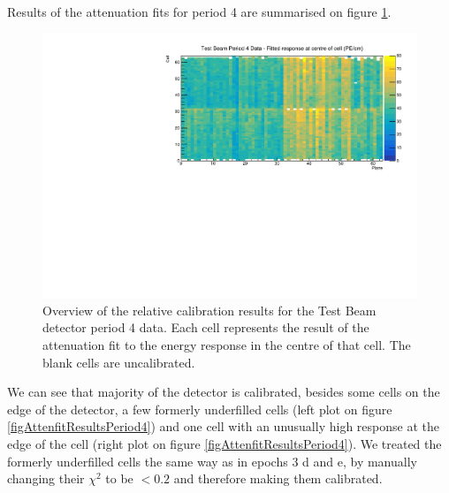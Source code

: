 \documentclass[12pt,a4paper]{article}
\begin{document}
Results of the attenuation fits for period 4 are summarised on figure \ref{figCellCentreResponsePeriod4}.

\begin{figure}[!hbtp]
\centering
\includegraphics[width=\textwidth]{Plots/CellResponseAtCentre_period4_Limited.pdf}
\caption{Overview of the relative calibration results for the Test Beam detector period 4 data. Each cell represents the result of the attenuation fit to the energy response in the centre of that cell. The blank cells are uncalibrated.}
\label{figCellCentreResponsePeriod4}
\end{figure}

We can see that majority of the detector is calibrated, besides some cells on the edge of the detector, a few formerly underfilled cells (left plot on figure \ref{figAttenfitResultsPeriod4}) and one cell with an unusually high response at the edge of the cell (right plot on figure \ref{figAttenfitResultsPeriod4}). We treated the formerly underfilled cells the same way as in epochs 3 d and e, by manually changing their $\chi^2$ to be $<0.2$ and therefore making them calibrated.
\end{document}
